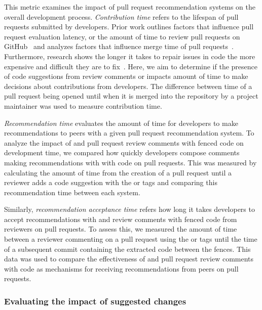 This metric examines the impact of pull request recommendation systems on the overall development process. \textit{Contribution time} refers to the lifespan of pull requests submitted by developers. Prior work outlines factors that influence pull request evaluation latency, or the amount of time to review pull requests on GitHub~\cite{yu2015wait} and analyzes factors that influence merge time of pull requests~\cite{gousios2014exploratory}. Furthermore, research shows the longer it takes to repair issues in code the more expensive and difficult they are to fix~\cite{Williams2007FaultFixTime}. Here, we aim to determine if the presence of code suggestions from review comments or \sugg impacts amount of time to make decisions about contributions from developers. The difference between time of a pull request being opened until when it is merged into the repository by a project maintainer was used to measure contribution time.

\textit{Recommendation time} evaluates the amount of time for developers to make recommendations to peers with a given pull request recommendation system. To analyze the impact of \sugg and pull request review comments with fenced code on development time, we compared how quickly developers compose comments making recommendations with with code on pull requests. This was measured by calculating the amount of time from the creation of a pull request until a reviewer adds a code suggestion with the \suggtag or \fence tags and comparing this recommendation time between each system.

Similarly, \textit{recommendation acceptance time} refers how long it takes developers to accept recommendations with \sugg and review comments with fenced code from reviewers on pull requests. To assess this, we measured the amount of time between a reviewer commenting on a pull request using the \suggtag or \fence tags until the time of a subsequent commit containing the extracted code between the fences. This data was used to compare the effectiveness of \suggs and pull request review comments with code as mechanisms for receiving recommendations from peers on pull requests.

\subsubsection{Evaluating the impact of suggested changes}

